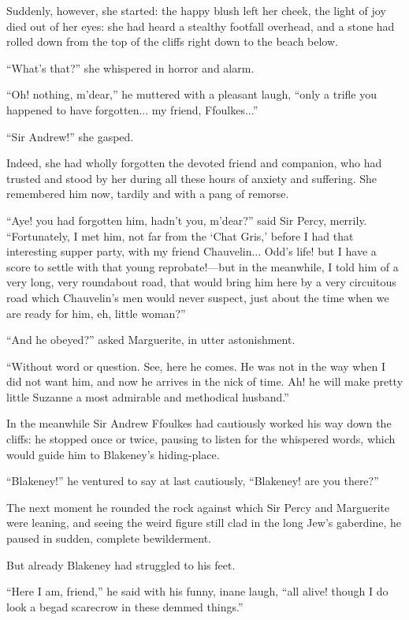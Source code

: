\documentclass[paper=5.5in:8.5in,BCOR=7mm,twoside,DIV=calc,12pt,usegeometry,chapterprefix,endperiod,headings=big]{scrbook}
\begin{document}
Suddenly, however, she started: the happy blush left her cheek, the light of joy died out of her eyes: she had heard a stealthy footfall overhead, and a stone had rolled down from the top of the cliffs right down to the beach below.

\enquote{What's that?} she whispered in horror and alarm.

\enquote{Oh! nothing, m'dear,} he muttered with a pleasant laugh, \enquote{only a trifle you happened to have forgotten... my friend, Ffoulkes...}

\enquote{Sir Andrew!} she gasped.

Indeed, she had wholly forgotten the devoted friend and companion, who had trusted and stood by her during all these hours of anxiety and suffering. She remembered him now, tardily and with a pang of remorse.

\enquote{Aye! you had forgotten him, hadn't you, m'dear?} said Sir Percy, merrily. \enquote{Fortunately, I met him, not far from the \enquote{Chat Gris,} before I had that interesting supper party, with my friend Chauvelin... Odd's life! but I have a score to settle with that young reprobate!---but in the meanwhile, I told him of a very long, very roundabout road, that would bring him here by a very circuitous road which Chauvelin's men would never suspect, just about the time when we are ready for him, eh, little woman?}

\enquote{And he obeyed?} asked Marguerite, in utter astonishment.

\enquote{Without word or question. See, here he comes. He was not in the way when I did not want him, and now he arrives in the nick of time. Ah! he will make pretty little Suzanne a most admirable and methodical husband.}

In the meanwhile Sir Andrew Ffoulkes had cautiously worked his way down the cliffs: he stopped once or twice, pausing to listen for the whispered words, which would guide him to Blakeney's hiding-place.

\enquote{Blakeney!} he ventured to say at last cautiously, \enquote{Blakeney! are you there?}

The next moment he rounded the rock against which Sir Percy and Marguerite were leaning, and seeing the weird figure still clad in the long Jew's gaberdine, he paused in sudden, complete bewilderment.

But already Blakeney had struggled to his feet.

\enquote{Here I am, friend,} he said with his funny, inane laugh, \enquote{all alive! though I do look a begad scarecrow in these demmed things.}
\end{document}
